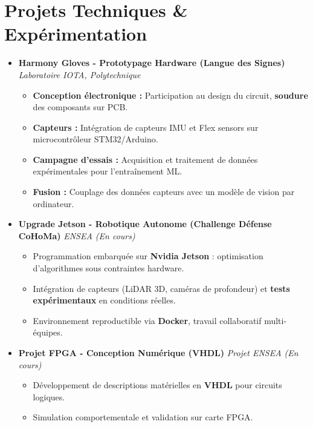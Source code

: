 \documentclass[a4paper,11pt]{article}
\begin{document}
\section{Projets Techniques \& Expérimentation}
\begin{itemize}[leftmargin=*, label={-}]

\item \textbf{Harmony Gloves - Prototypage Hardware (Langue des Signes)} \hfill \textit{Laboratoire IOTA, Polytechnique}
\vspace{-2pt}
    \begin{itemize}[leftmargin=0.4cm, nosep, label=\tiny$\bullet$]
        \item \small{\textbf{Conception électronique :} Participation au design du circuit, \textbf{soudure} des composants sur PCB.}
        \item \small{\textbf{Capteurs :} Intégration de capteurs IMU et Flex sensors sur microcontrôleur STM32/Arduino.}
        \item \small{\textbf{Campagne d'essais :} Acquisition et traitement de données expérimentales pour l'entraînement ML.}
        \item \small{\textbf{Fusion :} Couplage des données capteurs avec un modèle de vision par ordinateur.}
    \end{itemize}
    \vspace{2pt}

\item \textbf{Upgrade Jetson - Robotique Autonome (Challenge Défense CoHoMa)} \hfill \textit{ENSEA (En cours)}
\vspace{-2pt}
    \begin{itemize}[leftmargin=0.4cm, nosep, label=\tiny$\bullet$]
        \item \small{Programmation embarquée sur \textbf{Nvidia Jetson} : optimisation d'algorithmes sous contraintes hardware.}
        \item \small{Intégration de capteurs (LiDAR 3D, caméras de profondeur) et \textbf{tests expérimentaux} en conditions réelles.}
        \item \small{Environnement reproductible via \textbf{Docker}, travail collaboratif multi-équipes.}
    \end{itemize}
    \vspace{2pt}

\item \textbf{Projet FPGA - Conception Numérique (VHDL)} \hfill \textit{Projet ENSEA (En cours)}
\vspace{-2pt}
    \begin{itemize}[leftmargin=0.4cm, nosep, label=\tiny$\bullet$]
        \item \small{Développement de descriptions matérielles en \textbf{VHDL} pour circuits logiques.}
        \item \small{Simulation comportementale et validation sur carte FPGA.}
    \end{itemize}
    \vspace{2pt}


\end{itemize}
\end{document}
